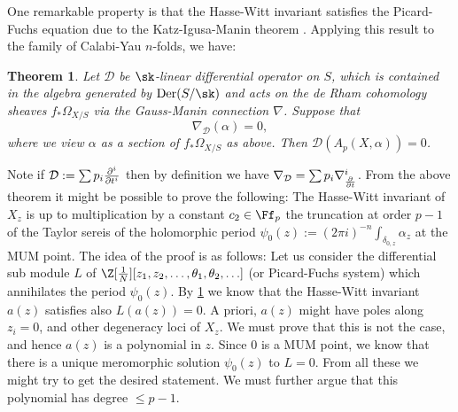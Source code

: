 \documentclass[11pt,leqno]{article}
\newtheorem{theo}{Theorem}
\theoremstyle{remark}
\theoremstyle{definition}
\begin{document}
One remarkable property is that the Hasse-Witt invariant satisfies the Picard-Fuchs equation due to the Katz-Igusa-Manin theorem \cite[Proposition 2.3.6.3]{Katz1972}. Applying this result to the family of Calabi-Yau $n$-folds, we have:
\begin{theo}
\label{01122025zutopia}
Let $\mathcal{D}$ be $\sk$-linear differential operator on $S$, which is contained in the algebra generated by $\mathrm{Der}(S/\sk)$ and acts on the de Rham cohomology sheaves $f_* \Omega_{X/S}$ via the Gauss-Manin connection $\nabla$. Suppose that
\[
\nabla_{\mathcal{D}}(\alpha) = 0,
\]
where we view $\alpha$ as a section of $f_* \Omega_{X/S}$ as above.
Then $\mathcal{D}(A_p(X, \alpha)) = 0$.
\end{theo}
Note if ${\cal D}:= \sum p_i\frac{\partial^i}{\partial t^i}$ then by definition we have $\nabla_{\cal  D}=\sum p_i\nabla_{\frac{\partial}{\partial t}}^i$. From the above theorem it might be possible to prove the following: 
 The Hasse-Witt invariant of $X_z$ is up to multiplication by a constant  $c_2\in\Ff_p$ 
 the truncation at order $p-1$ of the Taylor sereis of the holomorphic period $\psi_0(z):=(2\pi i)^{-n}\int_{\delta_{0,z}}\alpha_{z}$ at the MUM point. The idea of the proof is as follows: 
 Let us consider the differential sub module $L$ of $\Z[\frac{1}{N}][z_1,z_2,\ldots,\theta_1,\theta_2,\ldots]$ (or Picard-Fuchs system) which annihilates the period $\psi_0(z)$. 
By \cref{01122025zutopia} we know that the Hasse-Witt invariant $a(z)$ satisfies also $L(a(z))=0$. A priori, $a(z)$ might have poles along $z_i=0$, and other degeneracy loci of $X_z$. We must prove that this is not the case, and hence $a(z)$ is a polynomial in $z$. %
Since $0$ is a MUM point, we know that there is a unique meromorphic solution $\psi_0(z)$ to $L=0$.
From all these we might try to get the desired statement. We  must further argue that this polynomial has degree $\leq p-1$.   
\end{document}
